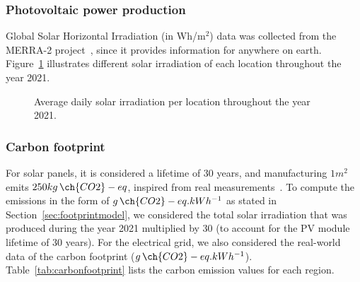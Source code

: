 \subsubsection{Photovoltaic power production}

Global Solar Horizontal Irradiation (in Wh/m$^{2}$) data was collected from the MERRA-2 project~\cite{GELARO2017MERRA2}, since it provides information for anywhere on earth. Figure~\ref{fig:pv_ghi} illustrates different solar irradiation of each location throughout the year 2021.%

 \begin{figure}[!htbp]
  \centering
   {}
  \caption{Average daily solar irradiation per location throughout the year 2021.}
  \label{fig:pv_ghi}
\end{figure}

\subsubsection{Carbon footprint}

For solar panels, it is considered a lifetime of 30 years, and manufacturing $1 m^2$ emits $250 kg\,\ch{CO2}-eq$, inspired from real measurements~\cite{YUE2014pv_carbon}. To compute the emissions in the form of $g\,\ch{CO2}-eq.kWh^{-1}$ as stated in Section~\ref{sec:footprintmodel}, we considered the total solar irradiation that was produced during the year 2021 multiplied by 30 (to account for the PV module lifetime of 30 years). For the electrical grid, we also considered the real-world data of the carbon footprint ($g\,\ch{CO2}-eq.kWh^{-1}$). Table~\ref{tab:carbonfootprint} lists the carbon emission values for each region.


